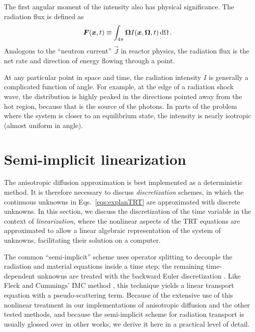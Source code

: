 The first angular moment of the intensity also has physical significance. The
radiation flux is defined as
\begin{equation} \label{eq:intensityFirst}
  \bm{F}(\bm{x},t) \equiv \int_{4\pi} \bm{\Omega}
  I(\bm{x},\bm{\Omega}, t) \mathop{}\!\mathrm{d} \Omega \,.
\end{equation}
Analogous to the ``neutron current'' $\vec{J}$ in reactor physics, the
radiation flux is the net rate and direction of energy flowing through a point.

At any particular point in space and time, the radiation intensity $I$ is
generally a complicated function of angle.
For example, at the edge of a
radiation shock wave, the distribution is highly peaked in the directions
pointed away from the hot region, because that is the source of the photons. In
parts of the problem where the system is closer to an equilibrium state,
the intensity is nearly isotropic (almost uniform in angle).

\section{Semi-implicit linearization}\label{sec:bgSemiImplicit}

The anisotropic diffusion approximation is best implemented as a deterministic
method. It is
therefore necessary to discuss \emph{discretization} schemes,
in which the continuous unknowns in Eqs.~\eqref{eqs:explanTRT} are approximated
with discrete unknowns. In this section, we discuss the discretization of the
time variable in the context of \emph{linearization}, where the nonlinear
aspects of the TRT equations are approximated to allow a linear algebraic
representation of the system of unknowns, facilitating their solution on a
computer.

The common
``semi-implicit'' scheme uses operator splitting
to decouple the radiation and material equations inside a time step; the
remaining time-dependent unknowns are treated with the backward Euler
discretization \cite{Kno1999a,Kno2001,Low2004}.
Like Fleck and Cummings' IMC method \cite{Fle1971}, this technique
yields a linear transport equation with a pseudo-scattering term. Because of the
extensive use of this
nonlinear treatment in our implementations of anisotropic diffusion and the
other tested methods, and because the semi-implicit scheme for radiation
transport is usually glossed over in other works, we derive
it here in a practical level of detail.

